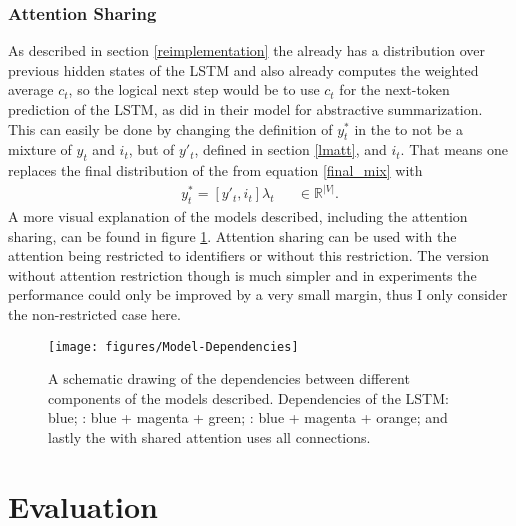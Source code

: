 \documentclass[11pt]{article}
\begin{document}
\subsubsection{Attention Sharing}
\label{attshar}
As described in section \ref{reimplementation} the \spn already has a distribution over previous hidden states of the LSTM and also already computes the weighted average $c_t$, so the logical next step would be to use $c_t$ for the next-token prediction of the LSTM, as \cite{See_2017} did in their model for abstractive summarization.
This can easily be done by changing the definition of $y^*_t$ in the \spn to not be a mixture of $y_t$ and $i_t$, but of $y'_t$, defined in section \ref{lmatt}, and $i_t$. That means one replaces the final distribution of the \spn from equation \ref{final_mix} with
\begin{align}
	y^*_t = [y'_t, i_t]\lambda_t &&\in \mathbb{R}^{|V|}.
\end{align}
A more visual explanation of the models described, including the attention sharing, can be found in figure \ref{dependencies}.
Attention sharing can be used with the attention being restricted to identifiers or without this restriction. The version without attention restriction though is much simpler and in experiments the performance could only be improved by a very small margin, thus I only consider the non-restricted case here. 

\begin{figure}
\centering
\texttt{[image: figures/Model-Dependencies]}
\caption{A schematic drawing of the dependencies between different components of the models described. Dependencies of the LSTM: blue; \lmatt: blue + magenta + green; \spn: blue + magenta + orange; and lastly the \spn with shared attention uses all connections.} 
\label{dependencies}
\end{figure}

\section{Evaluation}
\end{document}
